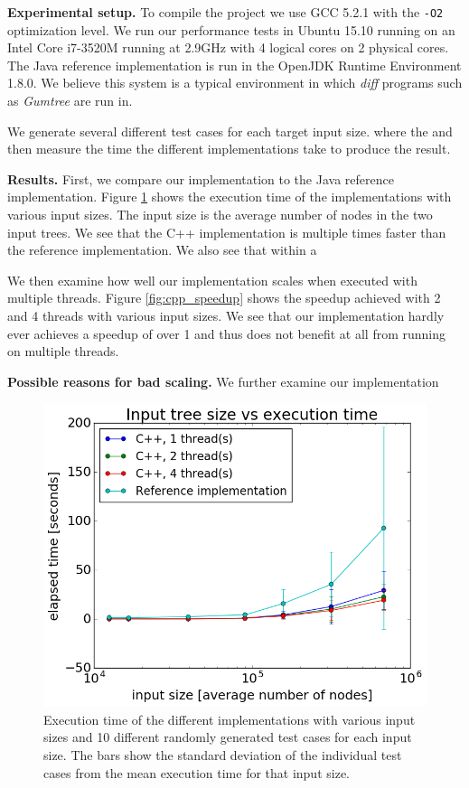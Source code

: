 \documentclass[letterpaper]{article}
\newcommand{\mypar}[1]{{\bf #1.}}
\begin{document}
\mypar{Experimental setup}
To compile the project we use GCC 5.2.1 with the \texttt{-O2} optimization level.
We run our performance tests in Ubuntu 15.10 running on an Intel Core i7-3520M running at 2.9GHz with 4 logical cores on 2 physical cores.
The Java reference implementation is run in the OpenJDK Runtime Environment 1.8.0.
We believe this system is a typical environment in which \emph{diff} programs such as \emph{Gumtree} are run in.

We generate several different test cases for each target input size. where the  and then measure the time the different implementations take to produce the result.

\mypar{Results}
First, we compare our implementation to the Java reference implementation.
Figure \ref{fig:cpp_vs_java} shows the execution time of the implementations with various input sizes.
The input size is the average number of nodes in the two input trees.
We see that the C++ implementation is multiple times faster than the reference implementation.
We also see that within a 

We then examine how well our implementation scales when executed with multiple threads.
Figure \ref{fig:cpp_speedup} shows the speedup achieved with 2 and 4 threads with various input sizes.
We see that our implementation hardly ever achieves a speedup of over 1 and thus does not benefit at all from running on multiple threads.

\mypar{Possible reasons for bad scaling}
We further examine our implementation 

\begin{figure}
	\includegraphics[width=\linewidth]{timePlot}
	\caption{Execution time of the different implementations with various input sizes and 10 different randomly generated test cases for each input size. The bars show the standard deviation of the individual test cases from the mean execution time for that input size.}
	\label{fig:cpp_vs_java}
\end{figure}
\end{document}
